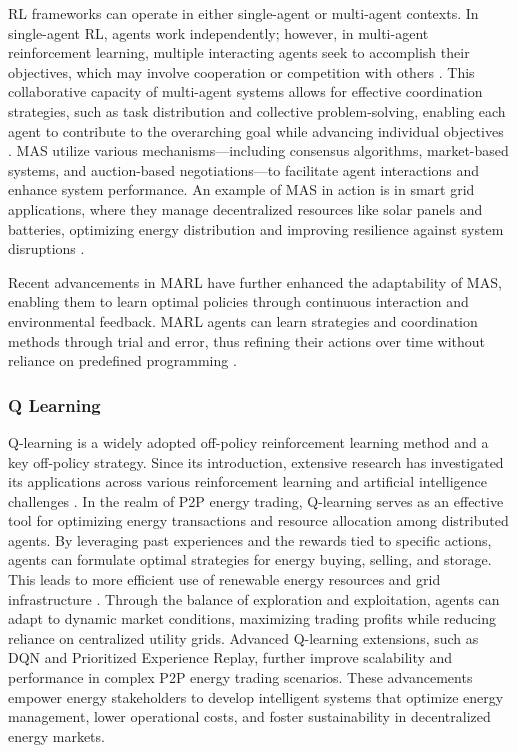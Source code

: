 \documentclass[preprint,12pt]{elsarticle}
\begin{document}
RL frameworks can operate in either single-agent or multi-agent contexts. In single-agent RL, agents work independently; however, in multi-agent reinforcement learning, multiple interacting agents seek to accomplish their objectives, which may involve cooperation or competition with others \cite{zhang2021multi}. This collaborative capacity of multi-agent systems allows for effective coordination strategies, such as task distribution and collective problem-solving, enabling each agent to contribute to the overarching goal while advancing individual objectives \cite{stone2010ad}. MAS utilize various mechanisms—including consensus algorithms, market-based systems, and auction-based negotiations—to facilitate agent interactions and enhance system performance. An example of MAS in action is in smart grid applications, where they manage decentralized resources like solar panels and batteries, optimizing energy distribution and improving resilience against system disruptions \cite{shobole2021multiagent}.

Recent advancements in MARL have further enhanced the adaptability of MAS, enabling them to learn optimal policies through continuous interaction and environmental feedback. MARL agents can learn strategies and coordination methods through trial and error, thus refining their actions over time without reliance on predefined programming \cite{zhang2021multi}.



\subsubsection{Q Learning}

Q-learning is a widely adopted off-policy reinforcement learning method and a key off-policy strategy. Since its introduction, extensive research has investigated its applications across various reinforcement learning and artificial intelligence challenges \cite{jang2019q}. In the realm of P2P energy trading, Q-learning serves as an effective tool for optimizing energy transactions and resource allocation among distributed agents. By leveraging past experiences and the rewards tied to specific actions, agents can formulate optimal strategies for energy buying, selling, and storage. This leads to more efficient use of renewable energy resources and grid infrastructure \cite{shah2024multi}. Through the balance of exploration and exploitation, agents can adapt to dynamic market conditions, maximizing trading profits while reducing reliance on centralized utility grids. Advanced Q-learning extensions, such as DQN and Prioritized Experience Replay, further improve scalability and performance in complex P2P energy trading scenarios. These advancements empower energy stakeholders to develop intelligent systems that optimize energy management, lower operational costs, and foster sustainability in decentralized energy markets.
\end{document}
